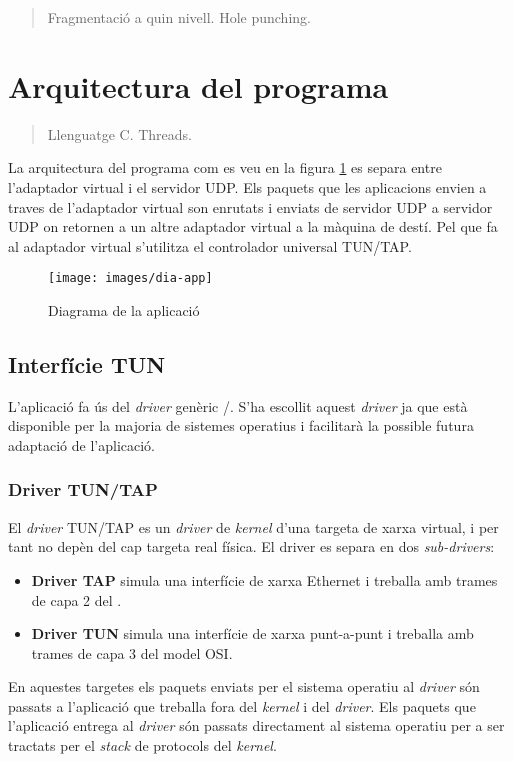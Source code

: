\begin{quote}
Fragmentació a quin nivell.
Hole punching.
\end{quote}
\clearpage%
\section{Arquitectura del programa}
\begin{quote}
Llenguatge C.
Threads.
\end{quote}
La arquitectura del programa com es veu en la figura \ref{F:dia-app} es separa entre l'adaptador virtual i el servidor UDP. Els paquets que les aplicacions envien a traves de l'adaptador virtual son enrutats i enviats de servidor UDP a servidor UDP on retornen a un altre adaptador virtual a la màquina de destí.
Pel que fa al adaptador virtual s'utilitza el controlador universal TUN/TAP.
\begin{figure}[htb]
\centering
\texttt{[image: images/dia-app]}
\caption{Diagrama de la aplicació}
\label{F:dia-app}
\end{figure}
\clearpage%
\subsection{Interfície TUN}
L'aplicació fa ús del \emph{driver} genèric /. S'ha escollit aquest \emph{driver} ja que està disponible per la majoria de sistemes operatius i facilitarà la possible futura adaptació de l'aplicació.

\subsubsection{Driver TUN/TAP}
El \emph{driver} TUN/TAP es un \emph{driver} de \emph{kernel} d'una targeta de xarxa virtual, i per tant no depèn del cap targeta real física. El driver es separa en dos \emph{sub-drivers}:
\begin{itemize}
\item \textbf{Driver TAP} simula una interfície de xarxa Ethernet i treballa amb trames de capa 2 del .
\item \textbf{Driver TUN} simula una interfície de xarxa punt-a-punt i treballa amb trames de capa 3 del model OSI.
\end{itemize}

En aquestes targetes els paquets enviats per el sistema operatiu al \emph{driver} són passats a l'aplicació que treballa fora del \emph{kernel} i del \emph{driver}. Els paquets que l'aplicació entrega al \emph{driver} són passats directament al sistema operatiu per a ser tractats per el \emph{stack} de protocols del \emph{kernel}.

